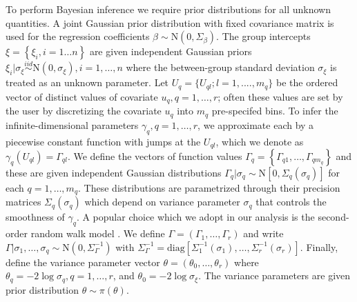 \documentclass[num-refs,serif,10pt]{wiley-article}
\begin{document}
To perform Bayesian inference we require prior distributions for all unknown quantities. A joint Gaussian prior distribution with fixed covariance matrix is used for the regression coefficients $\beta \sim  \text{N}(0,\Sigma_\beta)$. The group intercepts $\xi = \left\{ \xi_{i}, i = 1\ldots n\right\}$ are given independent Gaussian priors $\xi_{i} | \sigma_{\xi} \stackrel{iid}{\sim} \text{N}(0,\sigma_{\xi}),i = 1,\ldots,n$ where the between-group standard deviation $\sigma_{\xi}$ is treated as an unknown parameter. Let $U_{q} = \{U_{ql};l = 1, ...., m_q\}$ be the ordered vector of distinct values of covariate $u_q,q = 1,\ldots,r$; often these values are set by the user by discretizing the covariate $u_q$ into $m_q$ pre-specifed bins. To infer the infinite-dimensional parameters $\gamma_{q},q = 1,\ldots,r$, we approximate each by a piecewise constant function with jumps at the $U_{ql}$, which we denote as $\gamma_{q}(U_{ql}) = \Gamma_{ql}$. We define the vectors of function values $\Gamma_{q} = \left\{ \Gamma_{q1},\ldots,\Gamma_{qm_{q}}\right\}$ and these are given independent Gaussian distributions $\Gamma_{q}|\sigma_{q}\sim\text{N}\left[ 0,\Sigma_{q}(\sigma_{q})\right]$ for each $q = 1,\ldots,m_{q}$. These distributions are parametrized through their precision matrices $\Sigma_{q}(\sigma_{q})$ which depend on variance parameter $\sigma_{q}$ that controls the smoothness of $\gamma_{q}$. A popular choice which we adopt in our analysis is the second-order random walk model \cite{rw2}. We define $\Gamma = (\Gamma_{1},\ldots,\Gamma_{r})$ and write $\Gamma|\sigma_{1},\ldots,\sigma_{q}\sim\text{N}\left( 0,\Sigma^{-1}_{\Gamma}\right)$ with $\Sigma^{-1}_{\Gamma} = \text{diag}\left[ \Sigma_{1}^{-1}(\sigma_{1}),\ldots,\Sigma_{r}^{-1}(\sigma_{r})\right]$. Finally, define the variance parameter vector $\theta = (\theta_{0},\ldots,\theta_{r})$ where $\theta_{q} = -2\log\sigma_{q},q = 1,\ldots,r$, and $\theta_{0} = -2\log\sigma_{\xi}$. The variance parameters are given prior distribution $\theta \sim \pi(\theta)$. 
\end{document}
